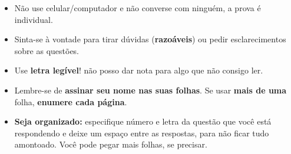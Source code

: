 \begin{itemize}[itemsep=0em]
  \item Não use celular/computador e não converse com ninguém, a prova é individual.
  \item Sinta-se à vontade para tirar dúvidas (\textbf{razoáveis}) ou pedir esclarecimentos sobre as questões.
  \item Use \textbf{letra legível}! não posso dar nota para algo que não consigo ler.
  \item Lembre-se de \textbf{assinar seu nome nas suas folhas}. Se usar \textbf{mais de uma} folha, \textbf{enumere cada página}.
  \item \textbf{Seja organizado:} especifique número e letra da questão que você está respondendo e deixe um espaço entre as respostas, para não ficar tudo amontoado. Você pode pegar mais folhas, se precisar.
\end{itemize}
